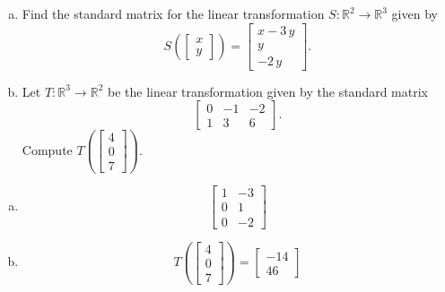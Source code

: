 
\begin{exerciseStatement}

\begin{enumerate}[(a)]
\item Find the standard matrix for the linear transformation \(S:\mathbb{R}^ 2  \to \mathbb{R}^ 3 \) given by \[S\left(  \left[\begin{array}{c}
x \\
y
\end{array}\right]  \right) =  \left[\begin{array}{c}
x - 3 \, y \\
y \\
-2 \, y
\end{array}\right] .\]
\item Let \(T:\mathbb{R}^ 3  \to \mathbb{R}^ 2 \) be the linear transformation given by the standard matrix \[ \left[\begin{array}{ccc}
0 & -1 & -2 \\
1 & 3 & 6
\end{array}\right] .\] Compute \(T\left( \left[\begin{array}{c}
4 \\
0 \\
7
\end{array}\right]  \right)\). 
\end{enumerate}
    
\end{exerciseStatement}
    
\begin{exerciseAnswer} 

\begin{enumerate}[(a)]
\item \[ \left[\begin{array}{cc}
1 & -3 \\
0 & 1 \\
0 & -2
\end{array}\right] \]
\item \[T\left( \left[\begin{array}{c}
4 \\
0 \\
7
\end{array}\right]  \right)= \left[\begin{array}{c}
-14 \\
46
\end{array}\right] \]
\end{enumerate}
    
\end{exerciseAnswer}
    

